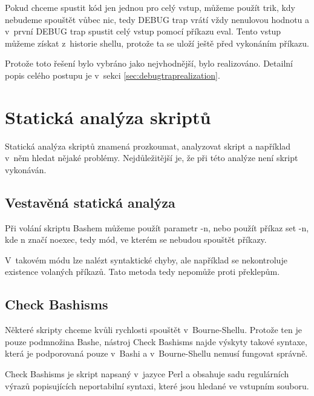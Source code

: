 \documentclass[thesis=M,czech]{FITthesis}[2012/06/26]
\begin{document}
Pokud chceme spustit kód jen jednou pro celý vstup, můžeme použít trik, kdy nebudeme spouštět vůbec nic, tedy DEBUG trap vrátí vždy nenulovou hodnotu a v~první DEBUG trap spustit celý vstup pomocí příkazu eval. Tento vstup můžeme získat z~historie shellu, protože ta se uloží ještě před vykonáním příkazu.

Protože toto řešení bylo vybráno jako nejvhodnější, bylo realizováno. Detailní popis celého postupu je v~sekci \ref{sec:debugtraprealization}.




\section{Statická analýza skriptů}

Statická analýza skriptů znamená prozkoumat, analyzovat skript a například v~něm hledat nějaké problémy. Nejdůležitější je, že při této analýze není skript vykonáván.


%
%
\subsection{Vestavěná statická analýza}

Při volání skriptu Bashem můžeme použít parametr -n, nebo použít příkaz set -n, kde n značí noexec, tedy mód, ve kterém se nebudou spouštět příkazy.

V~takovém módu lze nalézt syntaktické chyby, ale například se nekontroluje existence volaných příkazů. Tato metoda  tedy nepomůže proti překlepům.


%
%
\subsection{Check Bashisms}

Některé skripty chceme kvůli rychlosti spouštět v~Bourne-Shellu. Protože ten je pouze podmnožina Bashe, nástroj Check Bashisms \cite{checkbaskisms} najde výskyty takové syntaxe, která je podporovaná pouze v~Bashi a v~Bourne-Shellu nemusí fungovat správně.

Check Bashisms je skript napsaný v~jazyce Perl \cite{perl} a obsahuje sadu regulárních výrazů popisujících neportabilní syntaxi, které jsou hledané ve vstupním souboru.


\end{document}
